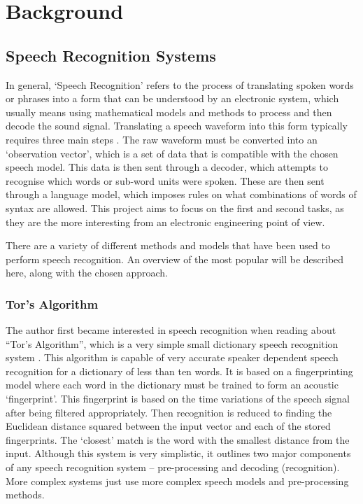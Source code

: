 \chapter{Background} %
\label{cha:background}

\section{Speech Recognition Systems} %
\label{sec:speech_recognition_systems}
In general, `Speech Recognition' refers to the process of translating spoken words or phrases into a form that can be understood by an electronic system, which usually means using mathematical models and methods to process and then decode the sound signal.  Translating a speech waveform into this form typically requires three main steps \cite{melnikoff2003speech}.  The raw waveform must be converted into an `observation vector', which is a set of data that is compatible with the chosen speech model.  This data is then sent through a decoder, which attempts to recognise which words or sub-word units were spoken.  These are then sent through a language model, which imposes rules on what combinations of words of syntax are allowed.  This project aims to focus on the first and second tasks, as they are the more interesting from an electronic engineering point of view.

There are a variety of different methods and models that have been used to perform speech recognition.  An overview of the most popular will be described here, along with the chosen approach.

\subsection{Tor's Algorithm} %
\label{sub:tors_algorithm}
The author first became interested in speech recognition when reading about ``Tor's Algorithm'', which is a very simple small dictionary speech recognition system \cite{tor2003}.  This algorithm is capable of very accurate speaker dependent speech recognition for a dictionary of less than ten words.  It is based on a fingerprinting model where each word in the dictionary must be trained to form an acoustic `fingerprint'.  This fingerprint is based on the time variations of the speech signal after being filtered appropriately.  Then recognition is reduced to finding the Euclidean distance squared between the input vector and each of the stored fingerprints.  The `closest' match is the word with the smallest distance from the input.
Although this system is very simplistic, it outlines two major components of any speech recognition system -- pre-processing and decoding (recognition).  More complex systems just use more complex speech models and pre-processing methods.

